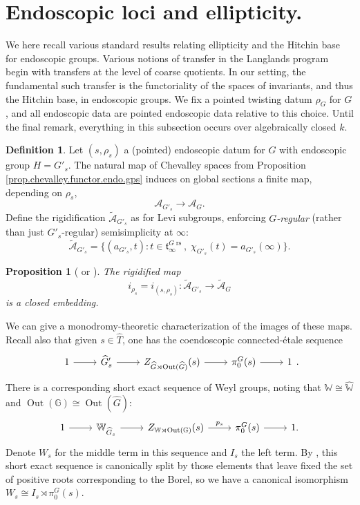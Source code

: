 \documentclass[openany]{amsbook}
\newtheorem{proposition}[theorem]{Proposition}
\theoremstyle{definition}
\newtheorem{definition}[theorem]{Definition}
\theoremstyle{remark}
\numberwithin{equation}{section}
\newcommand{\G}{\mathbb{G}}
\newcommand{\W}{\mathbb{W}}
\newcommand{\cA}{\mathcal{A}}
\renewcommand{\-}{\operatorname{-}}
\newcommand{\Out}{\operatorname{Out}}
\newcommand{\on}[1]{\operatorname{#1}}
\newcommand{\rs}{\on{rs}}
\newcommand{\ctA}{\widetilde{\cA}}
\newcommand{\ft}{\mathfrak{t}}
\begin{document}
\section{Endoscopic loci and ellipticity.}\label{subsect.hitchin.base.endoscopic}

We here recall various standard results relating ellipticity and the Hitchin base for endoscopic groups. Various notions of transfer in the Langlands program begin with transfers at the level of coarse quotients. In our setting, the fundamental such transfer is the functoriality of the spaces of invariants, and thus the Hitchin base, in endoscopic groups. We fix a pointed twisting datum $\rho_G$ for $G$, and all endoscopic data are pointed endoscopic data relative to this choice. Until the final remark, everything in this subsection occurs over algebraically closed $k$.

\begin{definition}\label{def.end.loci}
    Let $(s, \rho_s)$ a (pointed) endoscopic datum for $G$ with endoscopic group $H = G'_s$. The natural map of Chevalley spaces from Proposition \ref{prop.chevalley.functor.endo.gps} induces on global sections a finite map, depending on $\rho_s$,
    $$
        \cA_{G'_s} \to \cA_G.
    $$
    Define the rigidification $\ctA_{G'_s}$ as for Levi subgroups, enforcing \textit{$G$-regular} (rather than just $G'_s$-regular) semisimplicity at $\infty$:
    $$
        \ctA_{G'_s} = \{(a_{G'_s}, t) : t \in \ft_\infty^{G\rs}, \; \chi_{G'_s}(t) = a_{G'_s}(\infty)\}.
    $$
\end{definition}

\begin{proposition}[{{\cite[\S 1.9, Proposition 6.3.2]{ngofl} or \cite[{\S 5.1-5.3}]{geostabpadic}}}]\label{prop.hitchin.base.functorial.endoscopic.groups}
The rigidified map 
$$
    i_{\rho_s} = i_{(s, \rho_s)}: \ctA_{G'_s} \to \ctA_G
$$
is a closed embedding.
\end{proposition}






We can give a monodromy-theoretic characterization of the images of these maps. Recall also that given $s \in \widehat{T}$, one has the coendoscopic connected-\'etale sequence
\[
\begin{tikzcd}[ampersand replacement=\&]
        1 \ar[r] \& \widehat{G}'_s \ar[r] \& Z_{\widehat{G} \rtimes \Out(\widehat{G})}(s) \ar[r] \& \pi_0^G(s) \ar[r] \& 1
\end{tikzcd}.
\]
There is a corresponding short exact sequence of Weyl groups, noting that $\W \cong \widehat{\W}$ and $\Out(\G) \cong \Out(\widehat{G})$:
$$
\begin{tikzcd}
    1 \ar[r] & \W_{\widehat{G}_s} \ar[r] & Z_{\W \rtimes \Out(\G)}(s) \ar[r, "p_s"] & \pi_0^G(s) \ar[r] & 1.
\end{tikzcd}
$$
Denote $W_s$ for the middle term in this sequence and $I_s$ the left term. By \cite[Lemme 10.1]{ngoendo}, this short exact sequence is canonically split by those elements that leave fixed the set of positive roots corresponding to the Borel, so we have a canonical isomorphism $W_s \cong I_s \rtimes \pi_0^G(s)$. 
\end{document}
